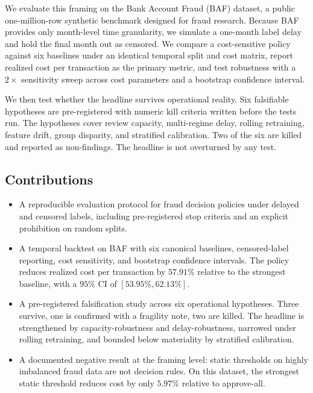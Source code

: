 \documentclass[conference]{IEEEtran}
\begin{document}
We evaluate this framing on the Bank Account Fraud (BAF) dataset, a public
one-million-row synthetic benchmark designed for fraud research. Because BAF
provides only month-level time granularity, we simulate a one-month label
delay and hold the final month out as censored. We compare a cost-sensitive
policy against six baselines under an identical temporal split and cost
matrix, report realized cost per transaction as the primary metric, and test
robustness with a $2\times$ sensitivity sweep across cost parameters and a
bootstrap confidence interval.

We then test whether the headline survives operational reality. Six
falsifiable hypotheses are pre-registered with numeric kill criteria written
before the tests run. The hypotheses cover review capacity, multi-regime
delay, rolling retraining, feature drift, group disparity, and stratified
calibration. Two of the six are killed and reported as non-findings. The
headline is not overturned by any test.

\subsection{Contributions}

\begin{itemize}
  \item A reproducible evaluation protocol for fraud decision policies under
  delayed and censored labels, including pre-registered stop criteria and an
  explicit prohibition on random splits.
  \item A temporal backtest on BAF with six canonical baselines,
  censored-label reporting, cost sensitivity, and bootstrap confidence
  intervals. The policy reduces realized cost per transaction by $57.91\%$
  relative to the strongest baseline, with a $95\%$ CI of $[53.95\%,
  62.13\%]$.
  \item A pre-registered falsification study across six operational
  hypotheses. Three survive, one is confirmed with a fragility note, two are
  killed. The headline is strengthened by capacity-robustness and
  delay-robustness, narrowed under rolling retraining, and bounded below
  materiality by stratified calibration.
  \item A documented negative result at the framing level: static thresholds
  on highly imbalanced fraud data are not decision rules. On this dataset,
  the strongest static threshold reduces cost by only $5.97\%$ relative to
  approve-all.
\end{itemize}
\end{document}
